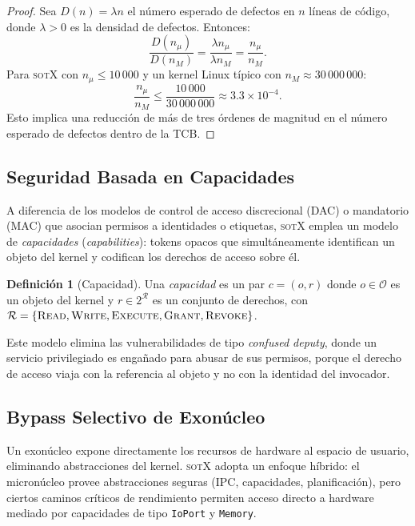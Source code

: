 \documentclass[11pt,twoside,openright]{book}
\theoremstyle{definition}
\newtheorem{definition}{Definición}[chapter]
\theoremstyle{plain}
\theoremstyle{remark}
\newcommand{\sotos}{\textsc{sotX}}
\newcommand{\rights}{\mathcal{R}}
\begin{document}
\begin{proof}
Sea $D(n) = \lambda n$ el número esperado de defectos en $n$ líneas de código, donde
$\lambda > 0$ es la densidad de defectos. Entonces:
\[
    \frac{D(n_\mu)}{D(n_M)} = \frac{\lambda n_\mu}{\lambda n_M} = \frac{n_\mu}{n_M}.
\]
Para \sotos{} con $n_\mu \leq 10\,000$ y un kernel Linux típico con $n_M \approx 30\,000\,000$:
\[
    \frac{n_\mu}{n_M} \leq \frac{10\,000}{30\,000\,000} \approx 3.3 \times 10^{-4}.
\]
Esto implica una reducción de más de tres órdenes de magnitud en el número esperado de
defectos dentro de la TCB.
\end{proof}

\subsection{Seguridad Basada en Capacidades}

A diferencia de los modelos de control de acceso discrecional (DAC) o mandatorio (MAC)
que asocian permisos a identidades o etiquetas, \sotos{} emplea un modelo de
\emph{capacidades} (\emph{capabilities}): tokens opacos que simultáneamente identifican
un objeto del kernel y codifican los derechos de acceso sobre él.

\begin{definition}[Capacidad]
\label{def:capability}
Una \emph{capacidad} es un par $c = (o, r)$ donde $o \in \mathcal{O}$ es un objeto del
kernel y $r \in 2^{\rights}$ es un conjunto de derechos, con
$\rights = \{\textsc{Read}, \textsc{Write}, \textsc{Execute}, \textsc{Grant}, \textsc{Revoke}\}$.
\end{definition}

Este modelo elimina las vulnerabilidades de tipo \emph{confused deputy}, donde un servicio
privilegiado es engañado para abusar de sus permisos, porque el derecho de acceso viaja
con la referencia al objeto y no con la identidad del invocador.

\subsection{Bypass Selectivo de Exonúcleo}

Un exonúcleo expone directamente los recursos de hardware al espacio de usuario,
eliminando abstracciones del kernel. \sotos{} adopta un enfoque híbrido: el micronúcleo
provee abstracciones seguras (IPC, capacidades, planificación), pero ciertos caminos
críticos de rendimiento permiten acceso directo a hardware mediado por capacidades de
tipo \texttt{IoPort} y \texttt{Memory}.
\end{document}
